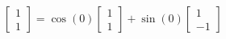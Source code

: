 \documentclass[preview]{standalone}
\begin{document}
\begin{center}
$\begin{bmatrix} 1 \\ 1\end{bmatrix} =\cos(0) \begin{bmatrix} 1 \\ 1\end{bmatrix} + \sin(0) \begin{bmatrix} 1 \\ -1\end{bmatrix}$
\end{center}
\end{document}
